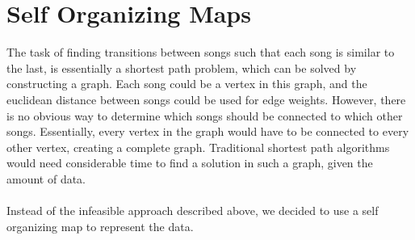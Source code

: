 
\section{Self Organizing Maps} %
\label{sec:self_organizing_maps}
The task of finding transitions between songs such that each song is similar to the last, is essentially a shortest path problem, which can be solved by constructing a graph. Each song could be a vertex in this graph, and the euclidean distance between songs could be used for edge weights. However, there is no obvious way to determine which songs should be connected to which other songs. Essentially, every vertex in the graph would have to be connected to every other vertex, creating a complete graph. Traditional shortest path algorithms would need considerable time to find a solution in such a graph, given the amount of data.
\\\\
Instead of the infeasible approach described above, we decided to use a self organizing map to represent the data.

